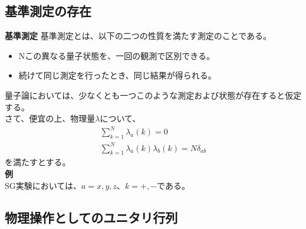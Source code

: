 \documentclass[a4paper,11pt]{jsarticle}
\begin{document}
\subsection{基準測定の存在}
\begin{itembox}[l]{\textbf{基準測定}}
    基準測定とは、以下の二つの性質を満たす測定のことである。
    \begin{itemize}
        \item Nこの異なる量子状態を、一回の観測で区別できる。
        \item 続けて同じ測定を行ったとき、同じ結果が得られる。
    \end{itemize}
\end{itembox}
量子論においては、少なくとも一つこのような測定および状態が存在すると仮定する。\\
さて、便宜の上、物理量$\lambda$について、
\begin{align}
    \sum_{k=1}^{N} \lambda_a(k)= 0\\
    \sum_{k=1}^{N} \lambda_a(k)\lambda_b(k)= N\delta_{ab}
\end{align}
を満たすとする。\\
\textbf{例}\\
SG実験においては、$a=x,y,z$、$k=+,-$である。\\

\subsection{物理操作としてのユニタリ行列}
\end{document}
